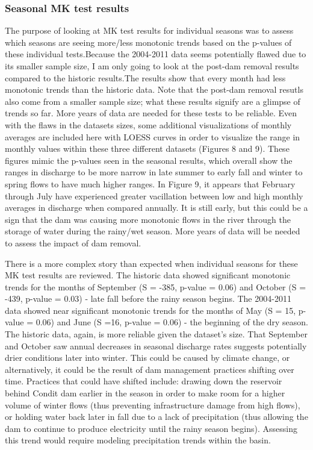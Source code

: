 \documentclass[
  12pt,
]{article}
\begin{document}
\hypertarget{seasonal-mk-test-results}{%
\subsubsection{Seasonal MK test
results}\label{seasonal-mk-test-results}}

The purpose of looking at MK test results for individual seasons was to
assess which seasons are seeing more/less monotonic trends based on the
p-values of these individual tests.Because the 2004-2011 data seems
potentially flawed due to its smaller sample size, I am only going to
look at the post-dam removal results compared to the historic
results.The results show that every month had less monotonic trends than
the historic data. Note that the post-dam removal resutls also come from
a smaller sample size; what these results signify are a glimpse of
trends so far. More years of data are needed for these tests to be
reliable. Even with the flaws in the datasets sizes, some additional
visualizations of monthly averages are included here with LOESS curves
in order to visualize the range in monthly values within these three
different datasets (Figures 8 and 9). These figures mimic the p-values
seen in the seasonal results, which overall show the ranges in discharge
to be more narrow in late summer to early fall and winter to spring
flows to have much higher ranges. In Figure 9, it appears that February
through July have experienced greater vacillation between low and high
monthly averages in discharge when compared annually. It is still early,
but this could be a sign that the dam was causing more monotonic flows
in the river through the storage of water during the rainy/wet season.
More years of data will be needed to assess the impact of dam removal.

There is a more complex story than expected when individual seasons for
these MK test results are reviewed. The historic data showed significant
monotonic trends for the months of September (S = -385, p-value = 0.06)
and October (S = -439, p-value = 0.03) - late fall before the rainy
season begins. The 2004-2011 data showed near significant monotonic
trends for the months of May (S = 15, p-value = 0.06) and June (S =16,
p-value = 0.06) - the beginning of the dry season. The historic data,
again, is more reliable given the dataset's size. That September and
October saw annual decreases in seasonal discharge rates suggests
potentially drier conditions later into winter. This could be caused by
climate change, or alternatively, it could be the result of dam
management practices shifting over time. Practices that could have
shifted include: drawing down the reservoir behind Condit dam earlier in
the season in order to make room for a higher volume of winter flows
(thus preventing infrastructure damage from high flows), or holding
water back later in fall due to a lack of precipitation (thus allowing
the dam to continue to produce electricity until the rainy season
begins). Assessing this trend would require modeling precipitation
trends within the basin.
\end{document}
